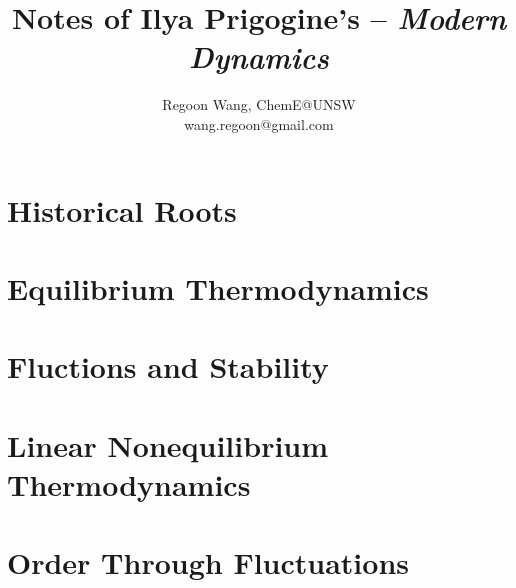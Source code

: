\documentclass[12pt]{report}
\begin{document}
 
\title{\textbf{Notes of Ilya Prigogine's -- \textit{Modern Dynamics}}}
\author{Regoon Wang, ChemE@UNSW \\ wang.regoon@gmail.com} 
 
\maketitle

\tableofcontents
\part{Historical Roots}
 



\part{Equilibrium Thermodynamics}

 
 

 


\part{Fluctions and Stability} 

 

\part{Linear Nonequilibrium Thermodynamics}


 
\part{Order Through Fluctuations} 


 
\end{document}
